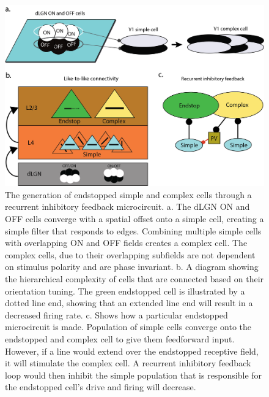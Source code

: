 \documentclass[12pt]{article}
\begin{document}
\begin{figure}[H]
  \centering
  \includegraphics[width=1.0 \textwidth]{adjusted_figures/LIF_Overview_Receptive_Field_Methods.png}
  \caption{The generation of endstopped simple and complex cells through a recurrent inhibitory feedback microcircuit. a. The dLGN ON and OFF cells converge with a spatial offset onto a simple cell, creating a simple filter that responds to edges. Combining multiple simple cells with overlapping ON and OFF fields creates a complex cell. The complex cells, due to their overlapping subfields are not dependent on stimulus polarity and are phase invariant. b. A diagram showing the hierarchical complexity of cells that are connected based on their orientation tuning. The green endstopped cell is illustrated by a dotted line end, showing that an extended line end will result in a decreased firing rate. c. Shows how a particular endstopped microcircuit is made. Population of simple cells converge onto the endstopped and complex cell to give them feedforward input. However, if a line would extend over the endstopped receptive field, it will stimulate the complex cell. A recurrent inhibitory feedback loop would then inhibit the simple population that is responsible for the endstopped cell's drive and firing will decrease.}
  \label{fig:LIF_Overview}
\end{figure}
\end{document}
